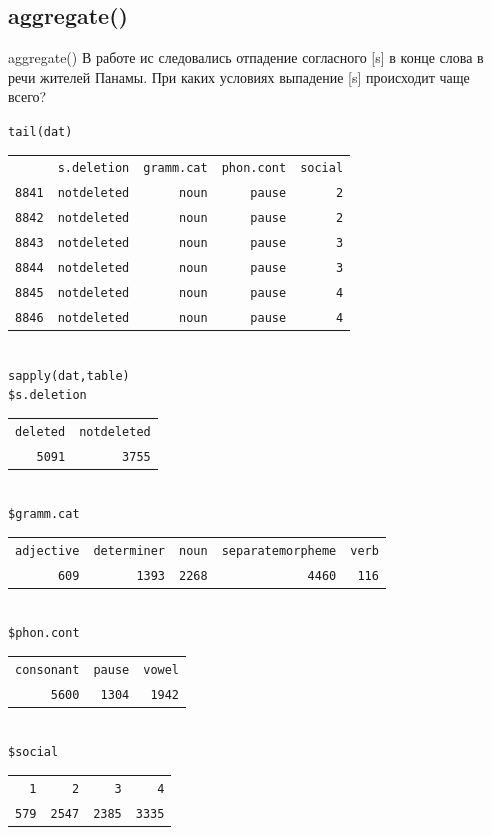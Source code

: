 \subsection{aggregate()}
\begin{frame}{aggregate()}
В работе \citep{cedergren73} ис следовались отпадение согласного [s] в конце слова в речи жителей Панамы. При каких условиях выпадение [s] происходит чаще всего?
\scriptsize
\begin{alltt}
\alert{tail(dat)}\\
\begin{tabular}{rrrrr}
 & s.deletion & gramm.cat & phon.cont & social \\
8841 & not deleted & noun & pause & 2 \\
8842 & not deleted & noun & pause & 2 \\
8843 & not deleted & noun & pause & 3 \\
8844 & not deleted & noun & pause & 3 \\
8845 & not deleted & noun & pause & 4 \\ 
8846 & not deleted & noun & pause & 4 \\ 
\end{tabular}
\\
\alert{sapply(dat, table)}\\
\$s.deletion\\
\begin{tabular}{rr}
deleted & not deleted \\
5091 & 3755 \\
\end{tabular}\\
\$gramm.cat\\
\begin{tabular}{rrrrr}
adjective & determiner & noun & separate morpheme & verb \\
609 & 1393 & 2268 & 4460 & 116 \\
\end{tabular}\\
\$phon.cont\\
\begin{tabular}{rrr}
consonant & pause & vowel \\
5600 & 1304 & 1942 \\
\end{tabular}\\
\$social\\
\begin{tabular}{rrrr}
1 & 2 & 3 & 4 \\
579 & 2547 & 2385 & 3335 \\
\end{tabular}
\end{alltt}
\normalsize
\end{frame}
